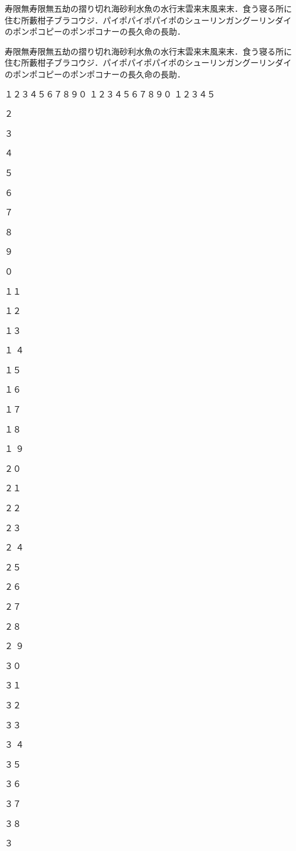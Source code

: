\documentclass[a4j, twocolumn, twoside, draft]{jsarticle}
\begin{document}
寿限無寿限無五劫の摺り切れ海砂利水魚の水行末雲来末風来末．食う寝る所に
住む所藪柑子ブラコウジ．パイポパイポパイポのシューリンガングーリンダイ
のポンポコピーのポンポコナーの長久命の長助．

寿限無寿限無五劫の摺り切れ海砂利水魚の水行末雲来末風来末．食う寝る所に
住む所藪柑子ブラコウジ．パイポパイポパイポのシューリンガングーリンダイ
のポンポコピーのポンポコナーの長久命の長助．

\newpage
\noindent １２３４５６７８９０
１２３４５６７８９０
１２３４５%
\par \noindent ２\par \noindent ３\par \noindent ４\par \noindent ５\par
\noindent ６\par \noindent ７\par \noindent ８\par \noindent ９\par \noindent ０\par
\noindent １１\par \noindent １２\par \noindent １３\par \noindent １
４\par \noindent １５\par
\noindent １６\par \noindent １７\par \noindent １８\par \noindent １
９\par \noindent ２０\par
\noindent ２１\par \noindent ２２\par \noindent ２３\par \noindent ２
４\par \noindent ２５\par
\noindent ２６\par \noindent ２７\par \noindent ２８\par \noindent ２
９\par \noindent ３０\par
\noindent ３１\par \noindent ３２\par \noindent ３３\par \noindent ３
４\par \noindent ３５\par
\noindent ３６\par \noindent ３７\par \noindent ３８\par \noindent ３
\end{document}
